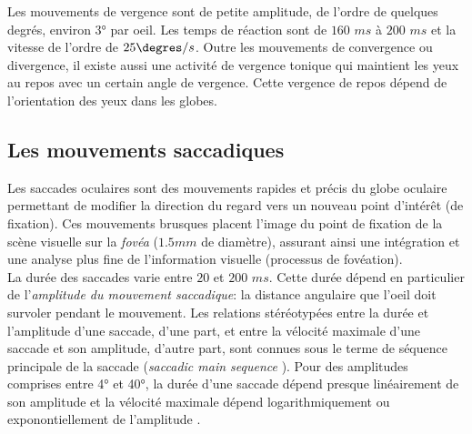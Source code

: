 Les mouvements de vergence sont de petite amplitude, de l'ordre de quelques degrés, environ $3°$ par oeil. Les temps de réaction sont de $160$ $ms$ à $200$ $ms$ et la vitesse de l'ordre de $25\degres/s$. Outre les mouvements de convergence ou divergence, il existe aussi une activité de vergence tonique qui maintient les yeux au repos avec un certain angle de vergence. Cette vergence de repos dépend de l'orientation des yeux dans les globes. \\

\subsection{Les mouvements saccadiques}

Les saccades oculaires sont des mouvements rapides et précis du globe oculaire permettant de modifier la direction du regard vers un nouveau point d'intérêt (de fixation). Ces mouvements brusques placent l'image du point de fixation de la scène visuelle sur la \textit{fovéa} ($1.5 mm$ de diamètre), assurant ainsi une intégration et une analyse plus fine de l'information visuelle (processus de fovéation).\\

La durée des saccades varie entre $20$ et $200$ $ms$. Cette durée dépend en particulier de l'\textit{amplitude du mouvement saccadique}: la distance angulaire que l'oeil doit survoler pendant le mouvement. Les relations stéréotypées entre la durée et l'amplitude d'une saccade, d'une part, et entre la vélocité maximale d'une saccade et son amplitude, d'autre part, sont connues sous le terme de séquence principale de la saccade (\textit{saccadic main sequence} \cite{Bahill:1975}). Pour des amplitudes comprises entre 4° et 40°, la durée d'une saccade dépend presque linéairement de son amplitude et la vélocité maximale dépend logarithmiquement ou exponontiellement de l'amplitude \cite{Becker:1991,Garbutt:2001}.\\ %
 
